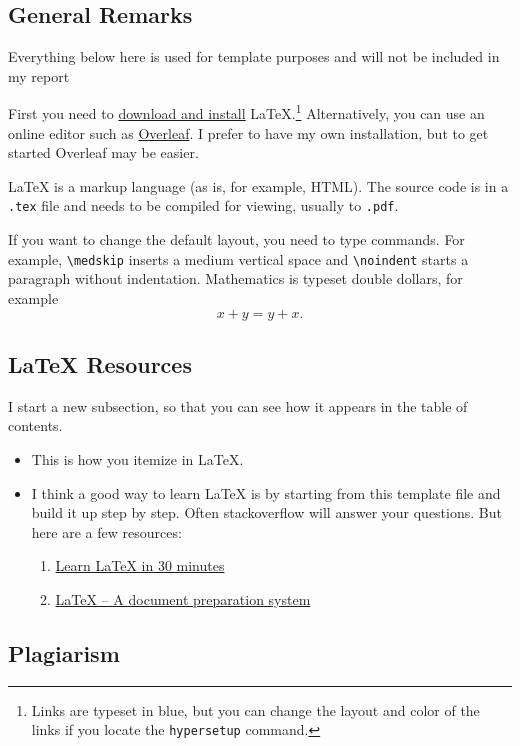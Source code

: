 \documentclass{article}
\begin{document}
\subsection{General Remarks}
Everything below here is used for template purposes and will not be included in my report


First you need to \href{https://www.latex-project.org/get/}{download and install} LaTeX.\footnote{Links are typeset in blue, but you can change the layout and color of the links if you locate the \texttt{hypersetup} command.}
%
Alternatively, you can use an online editor such as \href{https://www.overleaf.com/learn}{Overleaf}. I prefer to have my own installation, but to get started Overleaf may be easier.

\medskip\noindent
LaTeX is a markup language (as is, for example, HTML). The source code is in a \verb+.tex+ file and needs to be compiled for viewing, usually to \verb+.pdf+.


\medskip\noindent
If you want to change the default layout, you need to type commands. For example, \verb+\medskip+ inserts a medium vertical space and \verb+\noindent+ starts a paragraph without indentation.
\medskip\noindent
Mathematics is typeset double dollars, for example $$x+y=y+x.$$


\subsection{LaTeX Resources}

I start a new subsection, so that you can see how it appears in the table of contents.

\begin{itemize}
\item This is how you itemize in LaTeX.
\item I think a good way to learn LaTeX is by starting from this template file and build it up step by step. Often stackoverflow will answer your questions. But here are a few resources:
\begin{enumerate}
\item \href{https://www.overleaf.com/learn/latex/Learn_LaTeX_in_30_minutes}{Learn LaTeX in 30 minutes}
\item \href{https://www.latex-project.org/}{LaTeX – A document preparation system}\end{enumerate}
\end{itemize}

\subsection{Plagiarism}
\end{document}
